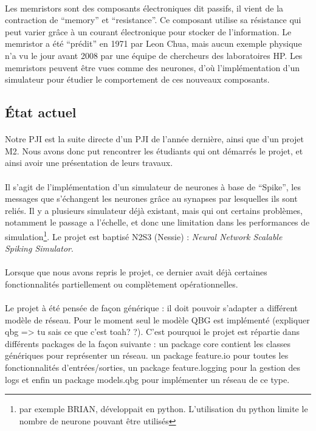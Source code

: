 \documentclass[a4paper,10pt]{article}
\begin{document}
\paragraph{}
Les memristors sont des composants électroniques dit passifs, il vient de la contraction de “memory” et “resistance”. Ce composant utilise sa résistance qui peut varier grâce à un courant électronique pour stocker de l’information. Le memristor a été “prédit” en 1971 par Leon Chua, mais aucun exemple physique n’a vu le jour avant 2008 par une équipe de chercheurs des laboratoires HP. Les memristors peuvent être vues comme des neurones, d’où l’implémentation d’un simulateur pour étudier le comportement de ces nouveaux composants.

\newpage

\subsection{État actuel}

\paragraph{}
Notre PJI est la suite directe d’un PJI de l’année dernière, ainsi que d’un projet M2. Nous avons donc put rencontrer les étudiants qui ont démarrés le projet, et ainsi avoir une présentation de leurs travaux.

\paragraph{}
Il s’agit de l’implémentation d’un simulateur de neurones à base de “Spike”, les messages que s’échangent les neurones grâce au synapses par lesquelles ils sont reliés. Il y a plusieurs simulateur déjà existant, mais qui  ont certains problèmes, notamment le passage a l’échelle, et donc une limitation dans les performances de simulation\footnote{par exemple BRIAN, développait en python. L'utilisation du python limite le nombre de neurone pouvant être utilisés}. Le projet est baptisé N2S3 (Nessie) : \emph{Neural Network Scalable Spiking Simulator}.

\paragraph{}
Lorsque que nous avons repris le projet, ce dernier avait déjà certaines fonctionnalités partiellement ou complètement opérationnelles.

\paragraph{}
Le projet à été pensée de façon générique : il doit pouvoir s’adapter a différent modèle de réseau. Pour le moment seul le modèle QBG est implémenté (expliquer qbg => tu sais ce que c’est toah? ?). C’est pourquoi le projet est répartie dans différents packages de la façon suivante : un package core contient les classes génériques pour représenter un réseau. un package feature.io pour toutes les fonctionnalités d’entrées/sorties, un package feature.logging pour la gestion des logs et enfin un package models.qbg pour implémenter un réseau de ce type.
\end{document}
